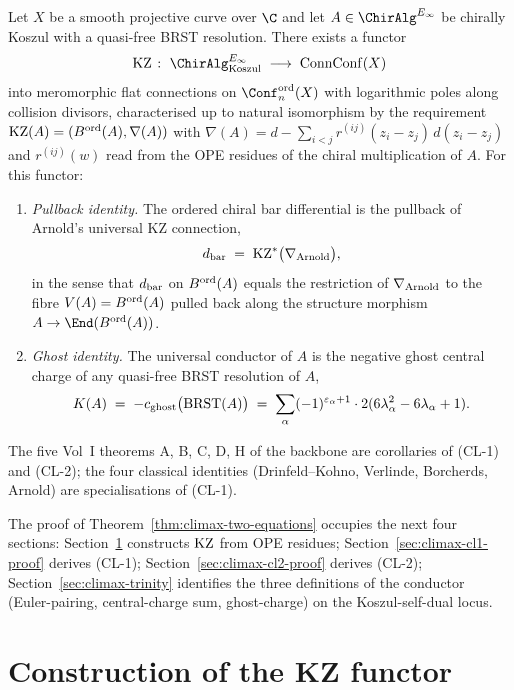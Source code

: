 \begin{theorem}
\label{thm:climax-two-equations}
\ClaimStatusProvedHere
Let \(X\) be a smooth projective curve over \(\C\) and let
\(A \in \ChirAlgInf\) be chirally Koszul with a quasi-free BRST
resolution. There exists a functor
\[
  \KZ \;\colon\; \ChirAlgInf_{\mathrm{Koszul}} \;\longrightarrow\; \mathrm{ConnConf}(X)
\]
into meromorphic flat connections on \(\Conf_{n}^{\mathrm{ord}}(X)\)
with logarithmic poles along collision divisors, characterised up to
natural isomorphism by the requirement
\(\mathrm{KZ}(A) = (B^{\mathrm{ord}}(A), \nabla(A))\) with
\(\nabla(A) = d - \sum_{i<j} r^{(ij)}(z_{i}-z_{j})\, d(z_{i}-z_{j})\)
and \(r^{(ij)}(w)\) read from the OPE residues of the chiral
multiplication of \(A\). For this functor:
\begin{enumerate}
\item[\textup{(CL-1)}]  \emph{Pullback identity.}
      The ordered chiral bar differential is the pullback of Arnold's
      universal KZ connection,
      \[
        d_{\mathrm{bar}} \;=\; \mathrm{KZ}^{*}\bigl(\nabla_{\mathrm{Arnold}}\bigr),
      \]
      in the sense that \(d_{\mathrm{bar}}\) on \(B^{\mathrm{ord}}(A)\) equals the restriction
      of \(\nabla_{\mathrm{Arnold}}\) to the fibre \(V(A) = B^{\mathrm{ord}}(A)\) pulled back along the
      structure morphism \(A \to \End(\Bord(A))\).
\item[\textup{(CL-2)}]  \emph{Ghost identity.}
      The universal conductor of \(A\) is the negative ghost central
      charge of any quasi-free BRST resolution of \(A\),
      \[
        K(A) \;=\; - c_{\mathrm{ghost}}\bigl(\mathrm{BRST}(A)\bigr)
             \;=\; \sum_{\alpha} (-1)^{\varepsilon_{\alpha} + 1} \cdot 2(6\lambda_{\alpha}^{2} - 6\lambda_{\alpha} + 1).
      \]
\end{enumerate}
The five Vol~I theorems \textup{A, B, C, D, H} of the backbone are
corollaries of \textup{(CL-1)} and \textup{(CL-2)}; the four classical
identities \textup{(Drinfeld--Kohno, Verlinde, Borcherds, Arnold)} are
specialisations of \textup{(CL-1)}.
\end{theorem}

The proof of Theorem~\ref{thm:climax-two-equations} occupies the next
four sections: Section~\ref{sec:climax-kz-construction} constructs
\(\mathrm{KZ}\) from OPE residues; Section~\ref{sec:climax-cl1-proof} derives
\textup{(CL-1)}; Section~\ref{sec:climax-cl2-proof} derives
\textup{(CL-2)}; Section~\ref{sec:climax-trinity} identifies the three
definitions of the conductor (Euler-pairing, central-charge sum,
ghost-charge) on the Koszul-self-dual locus.

\section{Construction of the KZ functor}
\label{sec:climax-kz-construction}

